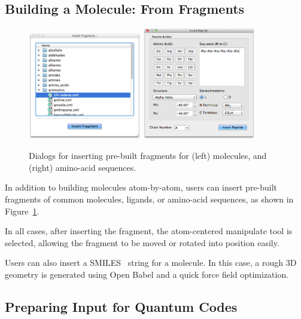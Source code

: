 \documentclass[10pt]{bmc_article}
\newenvironment{bmcformat}{\begin{raggedright}
\baselineskip20pt\sloppy\setboolean{publ}{false}}{\end{raggedright}
\baselineskip20pt\sloppy}
\begin{document}
\begin{bmcformat}
\subsection{Building a Molecule: From Fragments}

\begin{figure}
  \includegraphics[width=0.44\textwidth]{images/insert-fragment}
  \hspace{0.1cm}
  \includegraphics[width=0.44\textwidth]{images/insert-peptide}
  \caption{Dialogs for inserting pre-built fragments for (left)
    molecules, and (right) amino-acid sequences.}
  \label{f:insertdialogs}
\end{figure}

In addition to building molecules atom-by-atom, users can insert
pre-built fragments of common molecules, ligands, or amino-acid
sequences, as shown in Figure~\ref{f:insertdialogs}.

In all cases, after inserting the fragment, the atom-centered manipulate tool
is selected, allowing the fragment to be moved or rotated into
position easily.

Users can also insert a SMILES~\cite{smiles,opensmiles} string for a molecule. In
this case, a rough 3D geometry is generated using Open Babel and a
quick force field optimization.

\subsection{Preparing Input for Quantum Codes}


\end{bmcformat}
\end{document}
